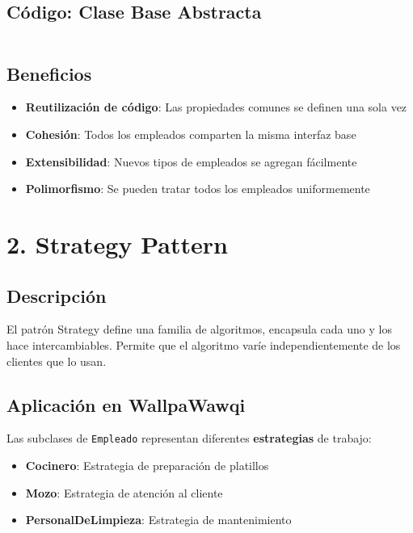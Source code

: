 \documentclass[12pt, a4paper]{report}
\begin{document}
\subsection{Código: Clase Base Abstracta}

\inputminted[firstline=1, lastline=35]{java}{../../src/main/java/com/wallpawawqi/Class/Empleado.java}

\subsection{Beneficios}

\begin{itemize}
    \item \textbf{Reutilización de código}: Las propiedades comunes se definen una sola vez
    \item \textbf{Cohesión}: Todos los empleados comparten la misma interfaz base
    \item \textbf{Extensibilidad}: Nuevos tipos de empleados se agregan fácilmente
    \item \textbf{Polimorfismo}: Se pueden tratar todos los empleados uniformemente
\end{itemize}

\newpage

\section{2. Strategy Pattern}

\subsection{Descripción}

El patrón Strategy define una familia de algoritmos, encapsula cada uno y los hace intercambiables. Permite que el algoritmo varíe independientemente de los clientes que lo usan.

\subsection{Aplicación en WallpaWawqi}

Las subclases de \texttt{Empleado} representan diferentes \textbf{estrategias} de trabajo:

\begin{itemize}
    \item \textbf{Cocinero}: Estrategia de preparación de platillos
    \item \textbf{Mozo}: Estrategia de atención al cliente
    \item \textbf{PersonalDeLimpieza}: Estrategia de mantenimiento
\end{itemize}
\end{document}
